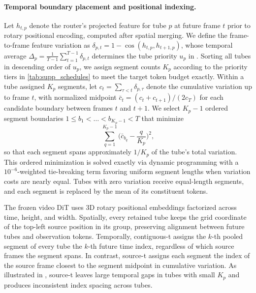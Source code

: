 \paragraph{Temporal boundary placement and positional indexing.}

Let $h_{t,p}$ denote the router's projected feature for tube $p$ at future frame $t$ prior to rotary positional encoding, computed after spatial merging.
We define the frame-to-frame feature variation as $\delta_{p,t} = 1 - \cos(h_{t,p}, h_{t+1,p})$, whose temporal average $\Delta_p = \frac{1}{T-1}\sum_{t=1}^{T-1}\delta_{p,t}$ determines the tube priority $u_p$ in .
Sorting all tubes in descending order of $u_p$, we assign segment counts $K_p$ according to the priority tiers in \cref{tab:supp_schedules} to meet the target token budget exactly.
Within a tube assigned $K_p$ segments, let $c_t = \sum_{\tau < t} \delta_{p,\tau}$ denote the cumulative variation up to frame $t$, with normalized midpoint $\bar{c}_t = (c_t + c_{t+1})/(2c_T)$ for each candidate boundary between frames $t$ and $t+1$.
We select $K_p - 1$ ordered segment boundaries $1 \le b_1 < \dots < b_{K_p-1} < T$ that minimize
\begin{equation}
  \sum_{q=1}^{K_p-1} \Big(\bar{c}_{b_q} - \frac{q}{K_p}\Big)^2 ,
  \label{eq:supp_cuts}
\end{equation}
so that each segment spans approximately $1/K_p$ of the tube's total variation.
This ordered minimization is solved exactly via dynamic programming with a $10^{-6}$-weighted tie-breaking term favoring uniform segment lengths when variation costs are nearly equal.
Tubes with zero variation receive equal-length segments, and each segment is replaced by the mean of its constituent tokens.

The frozen video DiT uses 3D rotary positional embeddings factorized across time, height, and width.
Spatially, every retained tube keeps the grid coordinate of the top-left source position in its group, preserving alignment between future tubes and observation tokens.
Temporally, contiguous-t assigns the $k$-th pooled segment of every tube the $k$-th future time index, regardless of which source frames the segment spans.
In contrast, source-t assigns each segment the index of the source frame closest to the segment midpoint in cumulative variation.
As illustrated in , source-t leaves large temporal gaps in tubes with small $K_p$ and produces inconsistent index spacing across tubes.

